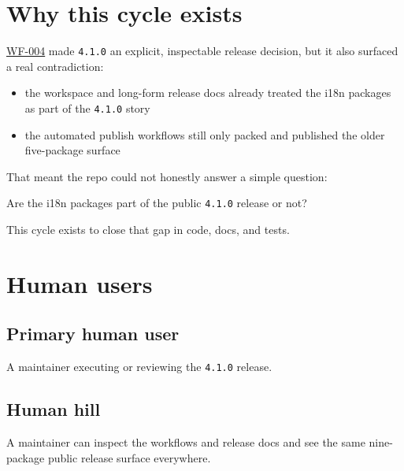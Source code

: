 \section{Why this cycle exists}\label{record-203-why-this-cycle-exists}

\href{https://github.com/flyingrobots/bijou/blob/cbd70612140e7a450d764b3c7be1c6af878b99bc/docs/design/WF-004-shape-the-next-release.md}{WF-004} made \texttt{4\allowbreak{}.\allowbreak{}1\allowbreak{}.\allowbreak{}0} an explicit, inspectable release decision, but it also surfaced a real contradiction:

\begin{itemize}
\tightlist
\item
  the workspace and long-form release docs already treated the i18n packages as part of the \texttt{4\allowbreak{}.\allowbreak{}1\allowbreak{}.\allowbreak{}0} story
\item
  the automated publish workflows still only packed and published the older five-package surface
\end{itemize}

That meant the repo could not honestly answer a simple question:

Are the i18n packages part of the public \texttt{4\allowbreak{}.\allowbreak{}1\allowbreak{}.\allowbreak{}0} release or not?

This cycle exists to close that gap in code, docs, and tests.

\section{Human users}\label{record-203-human-users}

\subsection{Primary human user}\label{record-203-primary-human-user}

A maintainer executing or reviewing the \texttt{4\allowbreak{}.\allowbreak{}1\allowbreak{}.\allowbreak{}0} release.

\subsection{Human hill}\label{record-203-human-hill}

A maintainer can inspect the workflows and release docs and see the same nine-package public release surface everywhere.

